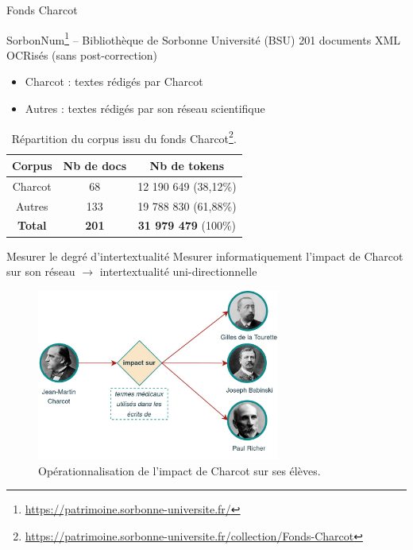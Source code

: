 \begin{frame}{Fonds Charcot}
\begin{block}{SorbonNum\footnote{\tiny{\url{https://patrimoine.sorbonne-universite.fr/}}} -- Bibliothèque de Sorbonne Université (BSU)}
201 documents XML OCRisés (sans post-correction)
\end{block}
\begin{itemize}
    \item \og{}Charcot\fg{} : textes rédigés par Charcot
    \item \og{}Autres\fg{} : textes rédigés par son réseau scientifique
\end{itemize}
\begin{table}[!ht]
    \centering
    \begin{tabular}{|c|c|c|}
    \hline 
    \rowcolor{gray!30}
       Corpus & Nb de docs & Nb de tokens \\
       \hline
       \og{}Charcot\fg{}  & 68 & 12 190 649 (38,12\%) \\
       \og{}Autres\fg{}  & 133 & 19 788 830 (61,88\%) \\
       \hline\hline
       \textbf{Total} & \textbf{201} & \textbf{31 979 479} (100\%)\\
       \hline
    \end{tabular}
    \caption{Répartition du corpus issu du fonds Charcot\footnote{\tiny{\url{https://patrimoine.sorbonne-universite.fr/collection/Fonds-Charcot}}}.}
    \label{tab:my_label}
\end{table}
\end{frame}


\begin{frame}{Mesurer le degré d'intertextualité}
Mesurer informatiquement l'impact de Charcot sur son réseau $\rightarrow$ intertextualité uni-directionnelle
\begin{figure}[!h]
    \centering
\includegraphics[width=80mm,scale=0.5]{pic/charcot_intertextualite.jpg}
    \caption{Opérationnalisation de l'impact de Charcot sur ses élèves.}
    \label{fig:my_label}
\end{figure}
\end{frame}

